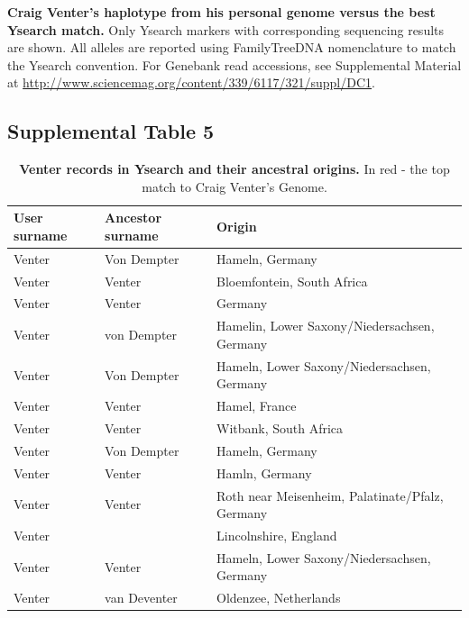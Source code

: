 \textbf{Craig Venter's haplotype from his personal genome versus the best Ysearch match.} Only Ysearch markers with corresponding sequencing results are shown. All alleles are reported using FamilyTreeDNA nomenclature to match the Ysearch convention. For Genebank read accessions, see Supplemental Material at \url{http://www.sciencemag.org/content/339/6117/321/suppl/DC1}.

\pagebreak
\subsection{Supplemental Table 5}
\begin{table}[h!]
\centering
\label{tab:sursuptab4}
\begin{adjustbox}{width=1\textwidth}
\begin{tabular}{l l l}
\hline
User surname & Ancestor surname & Origin \\
\hline
Venter & Von Dempter  & Hameln, Germany                                 \\
Venter & Venter       & Bloemfontein, South Africa                      \\
Venter & Venter       & Germany                                         \\
Venter & von Dempter  & Hamelin, Lower Saxony/Niedersachsen, Germany    \\
Venter & Von Dempter  & Hameln, Lower Saxony/Niedersachsen, Germany     \\
Venter & Venter       & Hamel, France                                   \\
Venter & Venter       & Witbank, South Africa                           \\
Venter & Von Dempter  & Hameln, Germany                                 \\
Venter & Venter       & Hamln, Germany                                  \\
Venter & Venter       & Roth near Meisenheim, Palatinate/Pfalz, Germany \\
Venter &              & Lincolnshire, England                           \\
Venter & Venter       & Hameln, Lower Saxony/Niedersachsen, Germany     \\
Venter & van Deventer & Oldenzee, Netherlands              \\
\hline
\end{tabular}
\end{adjustbox}
\caption{\textbf{Venter records in Ysearch and their ancestral origins.} In red - the top match to Craig Venter's Genome.}
\end{table}
